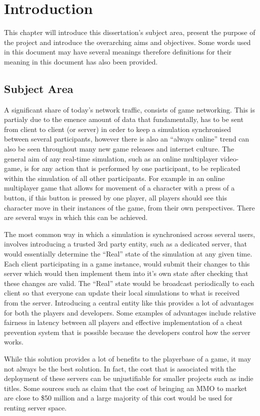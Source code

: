 \chapter{Introduction}
This chapter will introduce this dissertation's subject area, present the purpose of the project and introduce the overarching aims and objectives. Some words used in this document may have several meanings therefore definitions for their meaning in this document has also been provided.


\section{Subject Area}
A significant share of today's network traffic, consists of game networking. This is partialy due to the emence amount of data that fundamentally, has to be sent from client to client (or server) in order to keep a simulation synchronised between several participants, however there is also an ``always online'' trend can also be seen throughout many new game releases and internet culture. The general aim of any real-time simulation, such as an online multiplayer video-game, is for any action that is performed by one participant, to be replicated within the simulation of all other participants. For example in an online multiplayer game that allows for movement of a character with a press of a button, if this button is pressed by one player, all players should see this character move in their instances of the game, from their own perspectives. There are several ways in which this can be achieved.

The most common way in which a simulation is synchronised across several users, involves introducing a trusted 3rd party entity, such as a dedicated server, that would essentially determine the ``Real'' state of the simulation at any given time. Each client participating in a game instance, would submit their changes to this server which would then implement them into it's own state after checking that these changes are valid. The ``Real'' state would be broadcast periodically to each client so that everyone can update their local simulations to what is received from the server. Introducing a central entity like this provides a lot of advantages for both the players and developers. Some examples of advantages include relative fairness in latency between all players and effective implementation of a cheat prevention system that is possible because the developers control how the server works.

While this solution provides a lot of benefits to the playerbase of a game, it may not always be the best solution. In fact, the cost that is associated with the deployment of these servers can be unjustifiable for smaller projects such as indie titles. Some sources such as  claim that the cost of bringing an MMO to market are close to \$50 million and a large majority of this cost would be used for renting server space.

